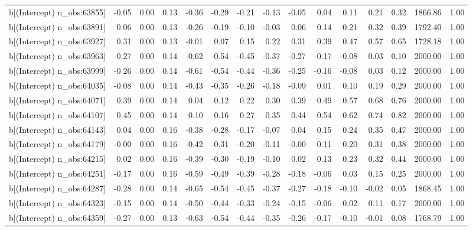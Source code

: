 \begin{table}[ht]
\begin{tabular}{rrrrrrrrrrrrrrr}
  b[(Intercept) n\_obs:63855] & -0.05 & 0.00 & 0.13 & -0.36 & -0.29 & -0.21 & -0.13 & -0.05 & 0.04 & 0.11 & 0.21 & 0.32 & 1866.86 & 1.00 \\ 
  b[(Intercept) n\_obs:63891] & 0.06 & 0.00 & 0.13 & -0.26 & -0.19 & -0.10 & -0.03 & 0.06 & 0.14 & 0.21 & 0.32 & 0.39 & 1792.40 & 1.00 \\ 
  b[(Intercept) n\_obs:63927] & 0.31 & 0.00 & 0.13 & -0.01 & 0.07 & 0.15 & 0.22 & 0.31 & 0.39 & 0.47 & 0.57 & 0.65 & 1728.18 & 1.00 \\ 
  b[(Intercept) n\_obs:63963] & -0.27 & 0.00 & 0.14 & -0.62 & -0.54 & -0.45 & -0.37 & -0.27 & -0.17 & -0.08 & 0.03 & 0.10 & 2000.00 & 1.00 \\ 
  b[(Intercept) n\_obs:63999] & -0.26 & 0.00 & 0.14 & -0.61 & -0.54 & -0.44 & -0.36 & -0.25 & -0.16 & -0.08 & 0.03 & 0.12 & 2000.00 & 1.00 \\ 
  b[(Intercept) n\_obs:64035] & -0.08 & 0.00 & 0.14 & -0.43 & -0.35 & -0.26 & -0.18 & -0.09 & 0.01 & 0.10 & 0.19 & 0.29 & 2000.00 & 1.00 \\ 
  b[(Intercept) n\_obs:64071] & 0.39 & 0.00 & 0.14 & 0.04 & 0.12 & 0.22 & 0.30 & 0.39 & 0.49 & 0.57 & 0.68 & 0.76 & 2000.00 & 1.00 \\ 
  b[(Intercept) n\_obs:64107] & 0.45 & 0.00 & 0.14 & 0.10 & 0.16 & 0.27 & 0.35 & 0.44 & 0.54 & 0.62 & 0.74 & 0.82 & 2000.00 & 1.00 \\ 
  b[(Intercept) n\_obs:64143] & 0.04 & 0.00 & 0.16 & -0.38 & -0.28 & -0.17 & -0.07 & 0.04 & 0.15 & 0.24 & 0.35 & 0.47 & 2000.00 & 1.00 \\ 
  b[(Intercept) n\_obs:64179] & -0.00 & 0.00 & 0.16 & -0.42 & -0.31 & -0.20 & -0.11 & -0.00 & 0.11 & 0.20 & 0.31 & 0.38 & 2000.00 & 1.00 \\ 
  b[(Intercept) n\_obs:64215] & 0.02 & 0.00 & 0.16 & -0.39 & -0.30 & -0.19 & -0.10 & 0.02 & 0.13 & 0.23 & 0.32 & 0.44 & 2000.00 & 1.00 \\ 
  b[(Intercept) n\_obs:64251] & -0.17 & 0.00 & 0.16 & -0.59 & -0.49 & -0.39 & -0.28 & -0.18 & -0.06 & 0.03 & 0.15 & 0.25 & 2000.00 & 1.00 \\ 
  b[(Intercept) n\_obs:64287] & -0.28 & 0.00 & 0.14 & -0.65 & -0.54 & -0.45 & -0.37 & -0.27 & -0.18 & -0.10 & -0.02 & 0.05 & 1868.45 & 1.00 \\ 
  b[(Intercept) n\_obs:64323] & -0.15 & 0.00 & 0.14 & -0.50 & -0.44 & -0.33 & -0.24 & -0.15 & -0.06 & 0.02 & 0.11 & 0.17 & 2000.00 & 1.00 \\ 
  b[(Intercept) n\_obs:64359] & -0.27 & 0.00 & 0.13 & -0.63 & -0.54 & -0.44 & -0.35 & -0.26 & -0.17 & -0.10 & -0.01 & 0.08 & 1768.79 & 1.00 \\ 

\end{tabular}
\end{table}
